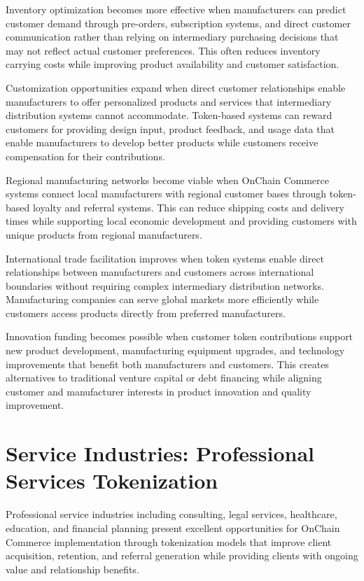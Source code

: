\documentclass[
  Letterpaper,
]{scrbook}
\begin{document}
Inventory optimization becomes more effective when manufacturers can
predict customer demand through pre-orders, subscription systems, and
direct customer communication rather than relying on intermediary
purchasing decisions that may not reflect actual customer preferences.
This often reduces inventory carrying costs while improving product
availability and customer satisfaction.

Customization opportunities expand when direct customer relationships
enable manufacturers to offer personalized products and services that
intermediary distribution systems cannot accommodate. Token-based
systems can reward customers for providing design input, product
feedback, and usage data that enable manufacturers to develop better
products while customers receive compensation for their contributions.

Regional manufacturing networks become viable when OnChain Commerce
systems connect local manufacturers with regional customer bases through
token-based loyalty and referral systems. This can reduce shipping costs
and delivery times while supporting local economic development and
providing customers with unique products from regional manufacturers.

International trade facilitation improves when token systems enable
direct relationships between manufacturers and customers across
international boundaries without requiring complex intermediary
distribution networks. Manufacturing companies can serve global markets
more efficiently while customers access products directly from preferred
manufacturers.

Innovation funding becomes possible when customer token contributions
support new product development, manufacturing equipment upgrades, and
technology improvements that benefit both manufacturers and customers.
This creates alternatives to traditional venture capital or debt
financing while aligning customer and manufacturer interests in product
innovation and quality improvement.

\section{Service Industries: Professional Services
Tokenization}\label{service-industries-professional-services-tokenization}

Professional service industries including consulting, legal services,
healthcare, education, and financial planning present excellent
opportunities for OnChain Commerce implementation through tokenization
models that improve client acquisition, retention, and referral
generation while providing clients with ongoing value and relationship
benefits.
\end{document}
